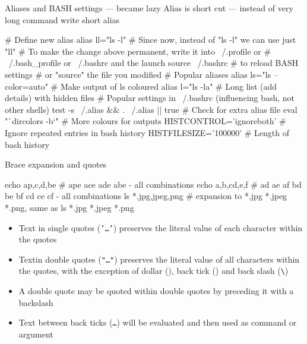 \documentclass[hyperref={bookmarks=true, unicode=true, colorlinks=true, pdftitle={Linux, command line and MetaCentrum}, plainpages=false, pdfauthor={Vojtech Zeisek}, pdfsubject={Course about use of Linux command line, writing shell scripts and using MetaCentrum of CESNET}, pdfcreator={XeLaTeX, http://www.xelatex.org/}, pdfkeywords={Linux, GNU, BASH, shell, command line, MetaCentrum}, linkcolor=Sienna, anchorcolor=black, citecolor=green, filecolor=magenta, menucolor=Sienna, urlcolor=cyan, pdftex}, compress, ucs, xelatex, xcolor=svgnames, 11pt]{beamer}
\begin{document}
\begin{frame}[fragile]{Aliases and BASH settings --- became lazy}
Alias is short cut --- instead of very long command write short alias
  \begin{bashcode}
    # Define new alias
    alias ll="ls -l"
    # Since now, instead of "ls -l" we can use just "ll"
    # To make the change above permanent, write it into ~/.profile or
    # ~/.bash_profile or ~/.bashrc and the launch
    source ~/.bashrc # to reload BASH settings
    # or "source" the file you modified
    # Popular aliases
    alias ls="ls --color=auto" # Make output of ls coloured
    alias l="ls -la" # Long list (add details) with hidden files
    # Popular settings in ~/.bashrc (influencing bash, not other shells)
    test -s ~/.alias && . ~/.alias || true # Check for extra alias file
    eval "`dircolors -b`" # More colours for outputs
    HISTCONTROL='ignoreboth' # Ignore repeated entries in bash history
    HISTFILESIZE='100000' # Length of bash history
  \end{bashcode}
\end{frame}

\begin{frame}[fragile]{Brace expansion and quotes}
  \begin{bashcode}
    echo a{p,c,d,b}e # ape ace ade abe - all combinations
    echo {a,b,c}{d,e,f} # ad ae af bd be bf cd ce cf - all combinations
    ls *.{jpg,jpeg,png} # expansion to *.jpg *.jpeg *.png, same as
    ls *.jpg *.jpeg *.png
  \end{bashcode}
\begin{itemize}
  \item Text in single quotes (\texttt{'\ldots'}) preserves the literal value of each character within the quotes
  \item Textin double quotes (\texttt{"\ldots"}) preserves the literal value of all characters within the quotes, with the exception of dollar (\texttt{\textdollar}), back tick (\texttt{\textasciigrave}) and back slash (\texttt{\textbackslash})
  \item A double quote may be quoted within double quotes by preceding it with a backslash
  \item Text between back ticks (\texttt{\textasciigrave\ldots\textasciigrave}) will be evaluated and then used as command or argument
\end{itemize}
\end{frame}
\end{document}
